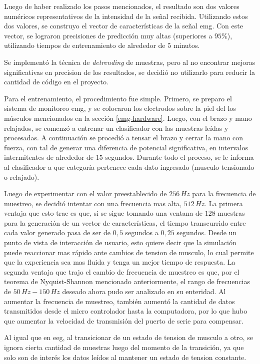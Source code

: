 Luego de haber realizado los pasos mencionados, el resultado son dos valores numéricos representativos de la intensidad de la señal recibida.  Utilizando estos dos valores, se construyo el vector de características de la señal \acrshort{emg}. Con este vector, se lograron precisiones de predicción muy altas (superiores a $ 95 \%$), utilizando tiempos de entrenamiento de alrededor de $5$ minutos.

Se implementó la técnica de \emph{detrending} de muestras, pero al no encontrar mejoras significativas en precision de los resultados, se decidió no utilizarlo para reducir la cantidad de código en el proyecto.

Para el entrenamiento, el procedimiento fue simple. Primero, se preparo el sistema de monitoreo \acrshort{emg}, y se colocaron los electrodos sobre la piel del los músculos mencionados en la sección \ref{emg-hardware}. Luego, con el brazo y mano relajados, se comenzó a entrenar un clasificador con las muestras leídas y procesadas. A continuación se procedió a tensar el brazo y cerrar la mano con fuerza, con tal de generar una diferencia de potencial significativa, en intervalos intermitentes de alrededor de $15$ segundos. Durante todo el proceso, se le informa al clasificador a que categoría pertenece cada dato ingresado (musculo tensionado o relajado).

Luego de experimentar con el valor preestablecido de $256\,Hz$ para la frecuencia de muestreo, se decidió intentar con una frecuencia mas alta, $512\,Hz$. La primera ventaja que esto trae es que, si se sigue tomando una ventana de $128$ muestras para la generación de un vector de características, el tiempo transcurrido entre cada valor generado pasa de ser de $0,5$ segundos a $0,25$ segundos. Desde un punto de vista de interacción de usuario, esto quiere decir que la simulación puede reaccionar mas rápido ante cambios de tension de musculo, lo cual permite que la experiencia sea mas fluida y tenga un mejor tiempo de respuesta. La segunda ventaja que trajo el cambio de frecuencia de muestreo es que, por el teorema de Nyquist-Shannon mencionado anteriormente, el rango de frecuencias de $50 \, Hz-150 \, Hz$ deseado ahora pudo ser analizado en su enteridad. Al aumentar la frecuencia de muestreo, también aumentó la cantidad de datos transmitidos desde el micro controlador hasta la computadora, por lo que hubo que aumentar la velocidad de transmisión del puerto de serie para compensar.

Al igual que en \acrshort{eeg}, al transicionar de un estado de tension de musculo a otro, se ignora cierta cantidad de muestras luego del momento de la transición, ya que solo son de interés los datos leídos al mantener un estado de tension constante. 

